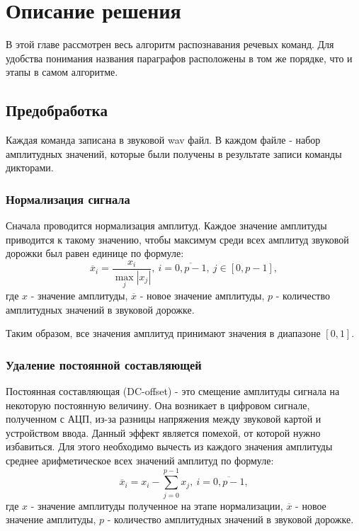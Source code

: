 \section{Описание решения}
В этой главе рассмотрен весь алгоритм распознавания речевых команд. Для удобства понимания названия параграфов расположены в том же порядке, что и этапы в самом алгоритме.

\subsection{Предобработка}
Каждая команда записана в звуковой wav файл. В каждом файле - набор амплитудных значений, которые были получены в результате записи команды дикторами. 

\subsubsection{Нормализация сигнала}
Сначала проводится нормализация амплитуд. Каждое значение амплитуды приводится к такому значению, чтобы максимум среди всех амплитуд звуковой дорожки был равен единице по формуле:
\begin{equation}
	\overline{x}_i=\dfrac{x_i}{\max_{j} |x_j|},~i=\overline{0, p-1},~j \in [0, p-1],
\end{equation}
где $x$ - значение амплитуды, $\overline{x}$ - новое значение амплитуды, $p$ - количество амплитудных значений в звуковой дорожке.

Таким образом, все значения амплитуд принимают значения в диапазоне $[0,1]$.

\subsubsection{Удаление постоянной составляющей}
Постоянная составляющая (DC-offset) - это смещение амплитуды сигнала на некоторую постоянную величину. Она возникает в цифровом сигнале, полученном с АЦП,  из-за разницы напряжения между звуковой картой и устройством ввода. Данный эффект является помехой, от которой нужно избавиться. Для этого необходимо вычесть из каждого значения амплитуды среднее арифметическое всех значений амплитуд по формуле:
\begin{equation}
\overline{x}_i=x_i - \sum_{j=0}^{p-1} x_j,~i=\overline{0, p-1},
\end{equation}
где $x$ - значение амплитуды полученное на этапе нормализации, $\overline{x}$ - новое значение амплитуды, $p$ - количество амплитудных значений в звуковой дорожке.


